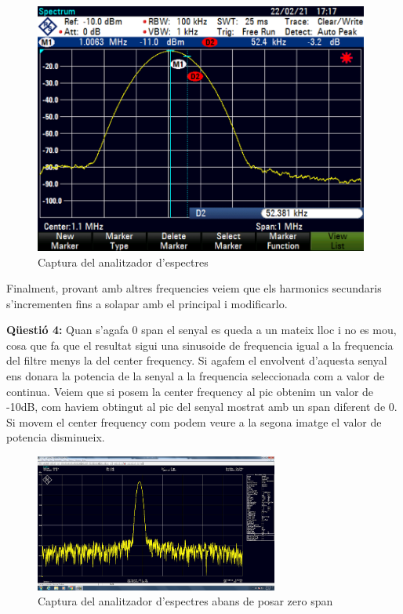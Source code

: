 \documentclass[12pt, a4papre]{article}
\begin{document}
	\begin{figure}[H]
		\begin{center}
		\includegraphics[width=110mm]{3.png}
		\caption{Captura del analitzador d'espectres}
		\end{center}
	\end{figure}
	
	Finalment, provant amb altres frequencies veiem que els harmonics secundaris s'incrementen fins a solapar amb el principal i modificarlo.
	
	\textbf{Qüestió 4:} Quan s'agafa 0 span el senyal es queda a un mateix lloc i no es mou, cosa que fa que el resultat sigui una sinusoide de frequencia igual a la frequencia del filtre menys la del center frequency. Si agafem el envolvent d'aquesta senyal ens donara la potencia de la senyal a la frequencia seleccionada com a valor de continua. Veiem que si posem la center frequency al pic obtenim un valor de -10dB, com haviem obtingut al pic del senyal mostrat amb un span diferent de 0. Si movem el center frequency com podem veure a la segona imatge el valor de potencia disminueix.
	
	\begin{figure}[H]
		\begin{center}
		\includegraphics[width=80mm]{4_3.png}
		\caption{Captura del analitzador d'espectres abans de posar zero span}
		\end{center}
	\end{figure}
	
\end{document}
